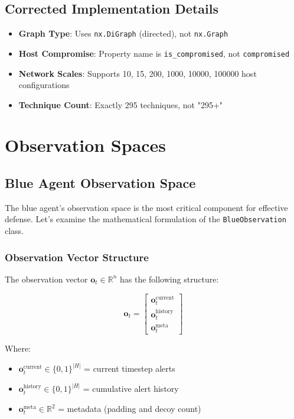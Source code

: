 \documentclass[12pt,a4paper]{article}
\begin{document}
\subsection{Corrected Implementation Details}
\begin{itemize}
    \item \textbf{Graph Type}: Uses \texttt{nx.DiGraph} (directed), not \texttt{nx.Graph}
    \item \textbf{Host Compromise}: Property name is \texttt{is\_compromised}, not \texttt{compromised}
    \item \textbf{Network Scales}: Supports 10, 15, 200, 1000, 10000, 100000 host configurations
    \item \textbf{Technique Count}: Exactly 295 techniques, not "295+"
\end{itemize}

\section{Observation Spaces}

\subsection{Blue Agent Observation Space}

The blue agent's observation space is the most critical component for effective defense. Let's examine the mathematical formulation of the \texttt{BlueObservation} class.

\subsubsection{Observation Vector Structure}
The observation vector $\mathbf{o}_t \in \mathbb{R}^n$ has the following structure:

\begin{equation}
\mathbf{o}_t = \begin{bmatrix}
\mathbf{o}_t^{\text{current}} \\
\mathbf{o}_t^{\text{history}} \\
\mathbf{o}_t^{\text{meta}}
\end{bmatrix}
\end{equation}

Where:
\begin{itemize}
    \item $\mathbf{o}_t^{\text{current}} \in \{0,1\}^{|H|}$ = current timestep alerts
    \item $\mathbf{o}_t^{\text{history}} \in \{0,1\}^{|H|}$ = cumulative alert history
    \item $\mathbf{o}_t^{\text{meta}} \in \mathbb{R}^2$ = metadata (padding and decoy count)
\end{itemize}
\end{document}
